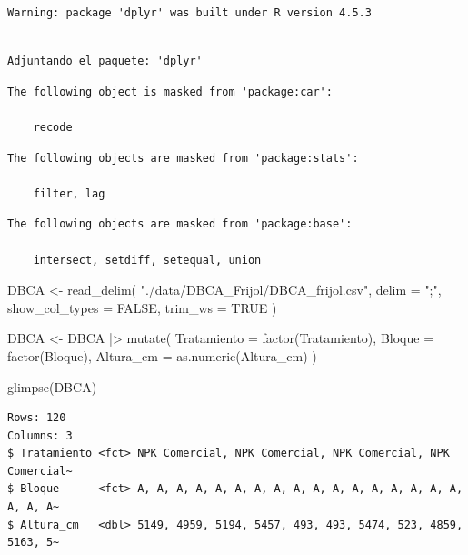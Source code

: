 \documentclass[
  spanish,
  letterpaper,
  DIV=11,
  numbers=noendperiod]{scrreprt}
\newenvironment{Shaded}{\begin{snugshade}}{\end{snugshade}}
\newcommand{\AttributeTok}[1]{\textcolor[rgb]{0.40,0.45,0.13}{#1}}
\newcommand{\ConstantTok}[1]{\textcolor[rgb]{0.56,0.35,0.01}{#1}}
\newcommand{\FunctionTok}[1]{\textcolor[rgb]{0.28,0.35,0.67}{#1}}
\newcommand{\NormalTok}[1]{\textcolor[rgb]{0.00,0.23,0.31}{#1}}
\newcommand{\OtherTok}[1]{\textcolor[rgb]{0.00,0.23,0.31}{#1}}
\newcommand{\SpecialCharTok}[1]{\textcolor[rgb]{0.37,0.37,0.37}{#1}}
\newcommand{\StringTok}[1]{\textcolor[rgb]{0.13,0.47,0.30}{#1}}
\begin{document}
\begin{verbatim}
Warning: package 'dplyr' was built under R version 4.5.3
\end{verbatim}

\begin{verbatim}

Adjuntando el paquete: 'dplyr'
\end{verbatim}

\begin{verbatim}
The following object is masked from 'package:car':

    recode
\end{verbatim}

\begin{verbatim}
The following objects are masked from 'package:stats':

    filter, lag
\end{verbatim}

\begin{verbatim}
The following objects are masked from 'package:base':

    intersect, setdiff, setequal, union
\end{verbatim}

\begin{Shaded}
\begin{Highlighting}[]
\NormalTok{DBCA }\OtherTok{\textless{}{-}} \FunctionTok{read\_delim}\NormalTok{(}
  \StringTok{"./data/DBCA\_Frijol/DBCA\_frijol.csv"}\NormalTok{,}
  \AttributeTok{delim =} \StringTok{";"}\NormalTok{,}
  \AttributeTok{show\_col\_types =} \ConstantTok{FALSE}\NormalTok{,}
  \AttributeTok{trim\_ws =} \ConstantTok{TRUE}
\NormalTok{)}

\NormalTok{DBCA }\OtherTok{\textless{}{-}}\NormalTok{ DBCA }\SpecialCharTok{|\textgreater{}}
  \FunctionTok{mutate}\NormalTok{(}
    \AttributeTok{Tratamiento =} \FunctionTok{factor}\NormalTok{(Tratamiento),}
    \AttributeTok{Bloque =} \FunctionTok{factor}\NormalTok{(Bloque),}
    \AttributeTok{Altura\_cm =} \FunctionTok{as.numeric}\NormalTok{(Altura\_cm)}
\NormalTok{  )}

\FunctionTok{glimpse}\NormalTok{(DBCA)}
\end{Highlighting}
\end{Shaded}

\begin{verbatim}
Rows: 120
Columns: 3
$ Tratamiento <fct> NPK Comercial, NPK Comercial, NPK Comercial, NPK Comercial~
$ Bloque      <fct> A, A, A, A, A, A, A, A, A, A, A, A, A, A, A, A, A, A, A, A~
$ Altura_cm   <dbl> 5149, 4959, 5194, 5457, 493, 493, 5474, 523, 4859, 5163, 5~
\end{verbatim}
\end{document}
